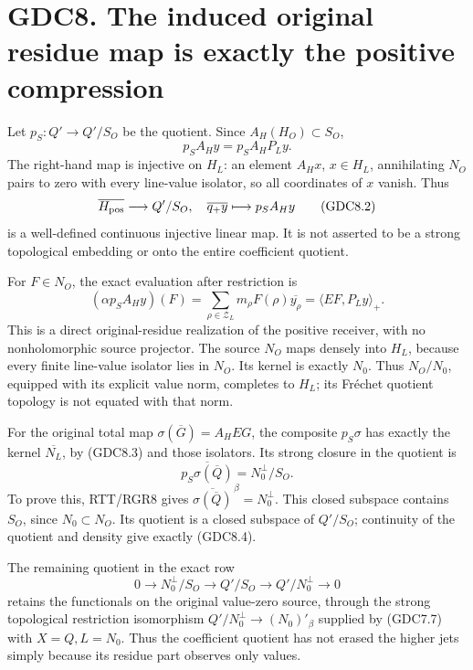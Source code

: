 \section{GDC8. The induced original residue map is exactly the positive
compression}\label{gdc8.-the-induced-original-residue-map-is-exactly-the-positive-compression}

Let \(p_S:Q'\to Q'/S_O\) be the quotient. Since \(A_H(H_O)\subset S_O\),
\[
p_S A_Hy=p_S A_HP_Ly.
\tag{GDC8.1}
\] The right-hand map is injective on \(H_L\): an element \(A_Hx\),
\(x\in H_L\), annihilating \(N_O\) pairs to zero with every line-value
isolator, so all coordinates of \(x\) vanish. Thus \[
\overline{H_{\rm pos}}\longrightarrow Q'/S_O,
\quad\overline{q_+y}\longmapsto p_S A_Hy
\tag{GDC8.2}
\] is a well-defined continuous injective linear map. It is not asserted
to be a strong topological embedding or onto the entire coefficient
quotient.

For \(F\in N_O\), the exact evaluation after restriction is \[
(\alpha p_S A_Hy)(F)
=\sum_{\rho\in\mathscr Z_L}m_\rho F(\rho)\overline{y_\rho}
=\langle EF,P_Ly\rangle_+.
\tag{GDC8.3}
\] This is a direct original-residue realization of the positive
receiver, with no nonholomorphic source projector. The source \(N_O\)
maps densely into \(H_L\), because every finite line-value isolator lies
in \(N_O\). Its kernel is exactly \(N_0\). Thus \(N_O/N_0\), equipped
with its explicit value norm, completes to \(H_L\); its Fréchet quotient
topology is not equated with that norm.

For the original total map \(\sigma(\overline G)=A_HEG\), the composite
\(p_S\sigma\) has exactly the kernel \(\overline{N_L}\), by (GDC8.3) and
those isolators. Its strong closure in the quotient is \[
\boxed{\overline{p_S\sigma(\overline Q)}=N_0^\perp/S_O.}
\tag{GDC8.4}
\] To prove this, RTT/RGR8 gives
\(\overline{\sigma(\overline Q)}^{\,\beta}=N_0^\perp\). This closed
subspace contains \(S_O\), since \(N_0\subset N_O\). Its quotient is a
closed subspace of \(Q'/S_O\); continuity of the quotient and density
give exactly (GDC8.4).

The remaining quotient in the exact row \[
0\to N_0^\perp/S_O\to Q'/S_O\to Q'/N_0^\perp\to0
\tag{GDC8.5}
\] retains the functionals on the original value-zero source, through
the strong topological restriction isomorphism
\(Q'/N_0^\perp\to (N_0)'_\beta\) supplied by (GDC7.7) with
\(X=Q,L=N_0\). Thus the coefficient quotient has not erased the higher
jets simply because its residue part observes only values.

